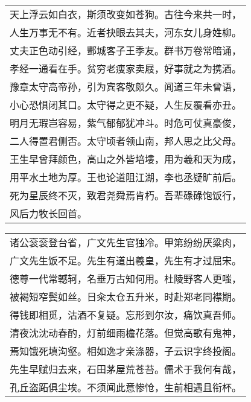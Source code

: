 \nopagebreak%
\nopagebreak%
\noindent\begin{minipage}{\linewidth}
  \vskip-3pt\begin{table}[H]
    \centering
    \begin{tabular}{@{}l@{}}
天上浮云如白衣，斯须改变如苍狗。古往今来共一时，\\
人生万事无不有。近者抉眼去其夫，河东女儿身姓柳。\\
丈夫正色动引经，酆城客子王季友。群书万卷常暗诵，\\
孝经一通看在手。贫穷老瘦家卖屐，好事就之为携酒。\\
豫章太守高帝孙，引为宾客敬颇久。闻道三年未曾语，\\
小心恐惧闭其口。太守得之更不疑，人生反覆看亦丑。\\
明月无瑕岂容易，紫气郁郁犹冲斗。时危可仗真豪俊，\\
二人得置君侧否。太守顷者领山南，邦人思之比父母。\\
王生早曾拜颜色，高山之外皆培塿，用为羲和天为成，\\
用平水土地为厚。王也论道阻江湖，李也丞疑旷前后。\\
死为星辰终不灭，致君尧舜焉肯朽。吾辈碌碌饱饭行，\\
风后力牧长回首。
    \end{tabular}
  \end{table}
\end{minipage}
\vspace{1cm}


\nopagebreak%
\nopagebreak%
\noindent\begin{minipage}{\linewidth}
  \vskip-3pt\begin{table}[H]
    \centering
    \begin{tabular}{@{}l@{}}
诸公衮衮登台省，广文先生官独冷。甲第纷纷厌粱肉，\\
广文先生饭不足。先生有道出羲皇，先生有才过屈宋。\\
德尊一代常轗轲，名垂万古知何用。杜陵野客人更嗤，\\
被褐短窄鬓如丝。日籴太仓五升米，时赴郑老同襟期。\\
得钱即相觅，沽酒不复疑。忘形到尔汝，痛饮真吾师。\\
清夜沈沈动春酌，灯前细雨檐花落。但觉高歌有鬼神，\\
焉知饿死填沟壑。相如逸才亲涤器，子云识字终投阁。\\
先生早赋归去来，石田茅屋荒苍苔。儒术于我何有哉，\\
孔丘盗跖俱尘埃。不须闻此意惨怆，生前相遇且衔杯。
    \end{tabular}
  \end{table}
\end{minipage}
\vspace{1cm}


